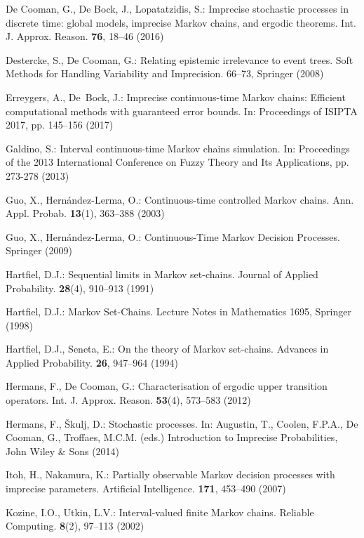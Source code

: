 \begin{thebibliography}{99.}
De Cooman, G., De Bock, J., Lopatatzidis, S.: {Imprecise stochastic processes in discrete time: global models, imprecise Markov chains, and ergodic theorems}. Int. J. Approx. Reason. \textbf{76}, 18--46 (2016)


Destercke, S., De Cooman, G.: {Relating epistemic irrelevance to event trees}. 
Soft Methods for Handling Variability and Imprecision. 66--73, Springer (2008)


Erreygers, A., De~Bock, J.: {Imprecise continuous-time Markov chains: Efficient computational methods with guaranteed error bounds}. In: Proceedings of ISIPTA 2017, pp. 145--156 (2017)

Galdino, S.: {Interval continuous-time Markov chains simulation}. In: Proceedings of the 2013 International Conference on Fuzzy Theory and Its Applications, pp. 273-278 (2013)

Guo, X., Hern{\'a}ndez-Lerma, O.: {Continuous-time controlled Markov chains}. Ann. Appl. Probab. \textbf{13}(1), 363--388 (2003)

Guo, X., Hern{\'a}ndez-Lerma, O.: {Continuous-Time Markov Decision Processes}. Springer (2009)


Hartfiel, D.J.: {Sequential limits in Markov set-chains}.
Journal of Applied Probability. \textbf{28}(4), 910--913 (1991)

Hartfiel, D.J.: {Markov Set-Chains}. Lecture Notes in Mathematics 1695, Springer (1998)

Hartfiel, D.J., Seneta, E.: {On the theory of Markov set-chains}.
Advances in Applied Probability. \textbf{26}, 947--964 (1994)

Hermans, F., De Cooman, G.: {Characterisation of ergodic upper transition operators}. Int. J. Approx. Reason. \textbf{53}(4), 573--583 (2012)

Hermans, F., {\v{S}}kulj, D.: {Stochastic processes}.
In: Augustin, T., Coolen, F.P.A., De Cooman, G., Troffaes, M.C.M. (eds.) Introduction to Imprecise Probabilities, {John Wiley \& Sons} (2014) 


Itoh, H., Nakamura, K.: {Partially observable Markov decision processes
with imprecise parameters}. Artificial Intelligence. \textbf{171}, 453--490 (2007)


Kozine, I.O., Utkin, L.V.: {Interval-valued finite Markov chains}.
Reliable Computing. \textbf{8}(2), 97--113 (2002)



\end{thebibliography}
